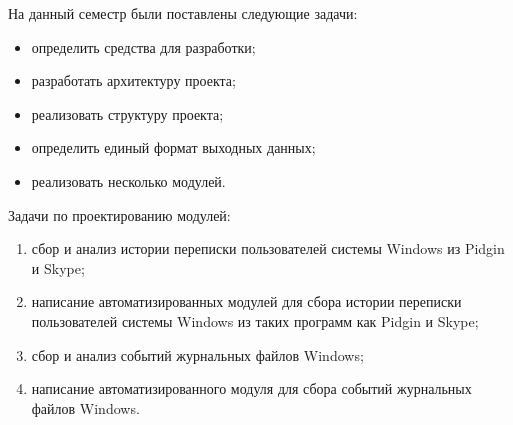 На данный семестр были поставлены следующие задачи:

\begin{itemize}
\item определить средства для разработки;
\item разработать архитектуру проекта;
\item реализовать структуру проекта;
\item определить единый формат выходных данных;
\item реализовать несколько модулей.
\end{itemize}

Задачи по проектированию модулей:

\begin{enumerate}
\item сбор и анализ истории переписки пользователей системы Windows из Pidgin и Skype;
\item написание автоматизированных модулей для сбора истории переписки пользователей системы Windows из таких программ как Pidgin и Skype;
\item сбор и анализ событий журнальных файлов Windows;
\item написание автоматизированного модуля для сбора событий журнальных файлов Windows.
\end{enumerate}
